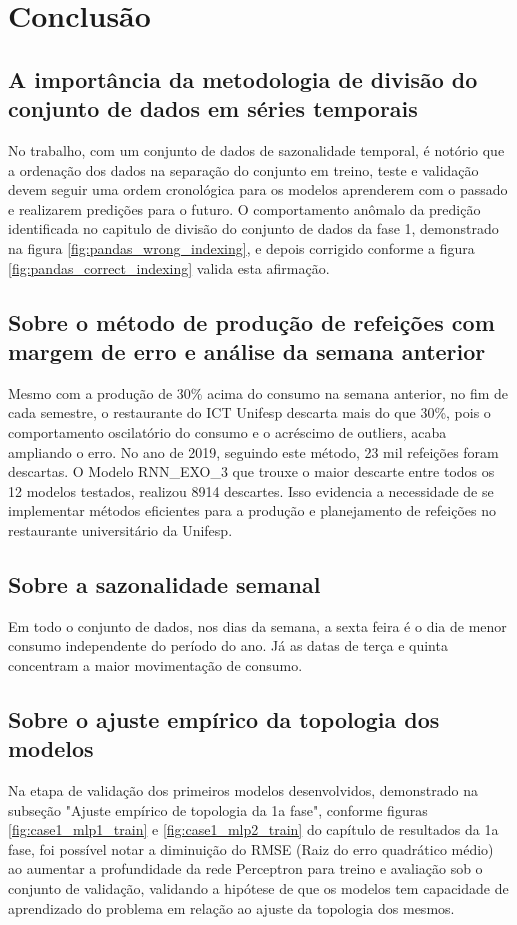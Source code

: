 \chapter{Conclusão} \label{cap:conclusoes}

    \section{A importância da metodologia de divisão do conjunto de dados em séries temporais}
       No trabalho, com um conjunto de dados de sazonalidade temporal, é notório que a ordenação dos dados na separação do conjunto em treino, teste e validação devem seguir uma ordem cronológica para os modelos aprenderem com o passado e realizarem predições para o futuro. 
        O comportamento anômalo da predição identificada no capitulo de divisão do conjunto de dados da fase 1, demonstrado na figura \ref{fig:pandas_wrong_indexing}, e depois corrigido conforme a figura \ref{fig:pandas_correct_indexing} valida esta afirmação.

    \section{Sobre o método de produção de refeições com margem de erro e análise da semana anterior}
        Mesmo com a produção de 30\% acima do consumo na semana anterior, no fim de cada semestre, o restaurante do ICT Unifesp descarta mais do que 30\%, pois o comportamento oscilatório do consumo e o acréscimo de outliers, acaba ampliando o erro. No ano de 2019, seguindo este método, 23 mil refeições foram descartas.
        O Modelo RNN\_EXO\_3 que trouxe o maior descarte entre todos os 12 modelos testados, realizou 8914 descartes.
        Isso evidencia a necessidade de se implementar métodos eficientes para a produção e planejamento de refeições no restaurante universitário da Unifesp.
    
    \section{Sobre a sazonalidade semanal}
        Em todo o conjunto de dados, nos dias da semana, a sexta feira é o dia de menor consumo independente do período do ano. Já as datas de terça e quinta concentram a maior movimentação de consumo.
    
    \section{Sobre o ajuste empírico da topologia dos modelos}
        Na etapa de validação dos primeiros modelos desenvolvidos, demonstrado na subseção "Ajuste empírico de topologia da 1a fase", conforme figuras \ref{fig:case1_mlp1_train} e \ref{fig:case1_mlp2_train} do capítulo de resultados da 1a fase, foi possível notar a diminuição do RMSE (Raiz do erro quadrático médio) ao aumentar a profundidade da rede Perceptron para treino e avaliação sob o conjunto de validação, validando a hipótese de que os modelos tem capacidade de aprendizado do problema em relação ao ajuste da topologia dos mesmos.
        
